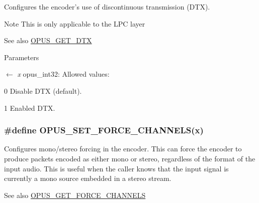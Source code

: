 Configures the encoder's use of discontinuous transmission (DTX). \begin{DoxyNote}{Note}
This is only applicable to the LPC layer 
\end{DoxyNote}
\begin{DoxySeeAlso}{See also}
\hyperlink{group__opus__encoderctls_gaafbb44454e9f57232b85e4e087337ded}{OPUS\_\-GET\_\-DTX} 
\end{DoxySeeAlso}

\begin{DoxyParams}{Parameters}
\item[\mbox{$\leftarrow$} {\em x}]{\ttfamily opus\_\-int32}: Allowed values: 
\begin{DoxyDescription}
\item[0]Disable DTX (default). 
\item[1]Enabled DTX. 
\end{DoxyDescription}\end{DoxyParams}
\hypertarget{group__opus__encoderctls_ga8450a745bd919a8de522afec115f3b5f}{
\subsubsection[{OPUS\_\-SET\_\-FORCE\_\-CHANNELS}]{\setlength{\rightskip}{0pt plus 5cm}\#define OPUS\_\-SET\_\-FORCE\_\-CHANNELS(x)}}
\label{group__opus__encoderctls_ga8450a745bd919a8de522afec115f3b5f}


Configures mono/stereo forcing in the encoder. This can force the encoder to produce packets encoded as either mono or stereo, regardless of the format of the input audio. This is useful when the caller knows that the input signal is currently a mono source embedded in a stereo stream. \begin{DoxySeeAlso}{See also}
\hyperlink{group__opus__encoderctls_ga21f010167c5dfa1b53f20c46d473e86a}{OPUS\_\-GET\_\-FORCE\_\-CHANNELS} 
\end{DoxySeeAlso}

